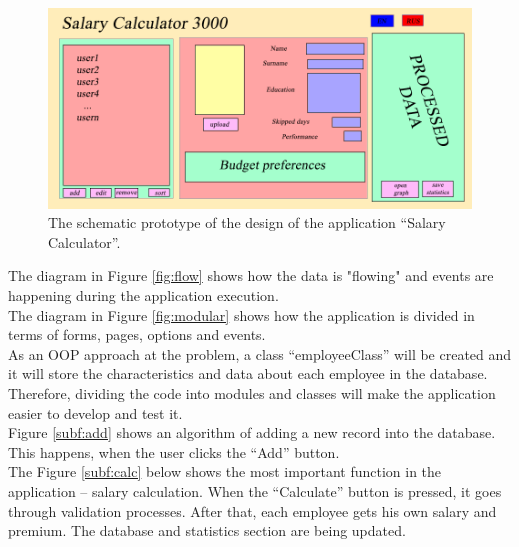 \documentclass[a4]{article}
\begin{document}
\begin{figure}[h!]
\begin{center}
  \includegraphics[width=\textwidth]{plan.png}
  \caption{The schematic prototype of the design of the application “Salary Calculator”.}
  \label{fig:plan}
\end{center}
\end{figure}

The diagram in Figure \ref{fig:flow} shows how the data is "flowing" and events are happening during the application execution.\\

The diagram in Figure \ref{fig:modular} shows how the application is divided in terms of forms, pages, options and events.\\

As an OOP approach at the problem, a class “employeeClass” will be created and it will store the characteristics and data about each employee in the database. Therefore, dividing the code into modules and classes will make the application easier to develop and test it.\\
Figure \ref{subf:add} shows an algorithm of adding a new record into the database. This happens, when the user clicks the “Add” button.\\

The Figure \ref{subf:calc} below shows the most important function in the application – salary calculation. When the “Calculate” button is pressed, it goes through validation processes. After that, each employee gets his own salary and premium. The database and statistics section are being updated.
\end{document}
